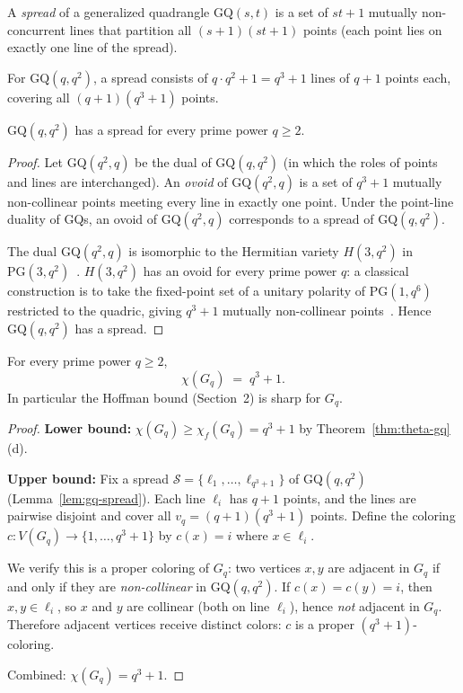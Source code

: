 \begin{definition}
A \emph{spread} of a generalized quadrangle $\mathrm{GQ}(s,t)$ is a set of $st+1$ mutually non-concurrent lines that partition all $(s+1)(st+1)$ points (each point lies on exactly one line of the spread).
\end{definition}

For $\mathrm{GQ}(q,q^2)$, a spread consists of $q\cdot q^2+1=q^3+1$ lines of $q+1$ points each, covering all $(q+1)(q^3+1)$ points.

\begin{lemma}\label{lem:gq-spread}
$\mathrm{GQ}(q,q^2)$ has a spread for every prime power $q\ge 2$.
\end{lemma}

\begin{proof}
Let $\mathrm{GQ}(q^2,q)$ be the dual of $\mathrm{GQ}(q,q^2)$ (in which the roles of points and lines are interchanged).  An \emph{ovoid} of $\mathrm{GQ}(q^2,q)$ is a set of $q^3+1$ mutually non-collinear points meeting every line in exactly one point.  Under the point-line duality of GQs, an ovoid of $\mathrm{GQ}(q^2,q)$ corresponds to a spread of $\mathrm{GQ}(q,q^2)$.

The dual $\mathrm{GQ}(q^2,q)$ is isomorphic to the Hermitian variety $H(3,q^2)$ in $\mathrm{PG}(3,q^2)$~\cite{PT1984}.  $H(3,q^2)$ has an ovoid for every prime power $q$: a classical construction is to take the fixed-point set of a unitary polarity of $\mathrm{PG}(1,q^6)$ restricted to the quadric, giving $q^3+1$ mutually non-collinear points~\cite{PT1984}.  Hence $\mathrm{GQ}(q,q^2)$ has a spread.
\end{proof}

\begin{theorem}\label{thm:chi-exact}
For every prime power $q\ge 2$,
\[
  \chi(G_q) \;=\; q^3+1.
\]
In particular the Hoffman bound (Section~2) is sharp for $G_q$.
\end{theorem}

\begin{proof}
\textbf{Lower bound:} $\chi(G_q)\ge\chi_f(G_q)=q^3+1$ by Theorem~\ref{thm:theta-gq}(d).

\textbf{Upper bound:} Fix a spread $\mathcal{S}=\{\ell_1,\ldots,\ell_{q^3+1}\}$ of $\mathrm{GQ}(q,q^2)$ (Lemma~\ref{lem:gq-spread}).  Each line $\ell_i$ has $q+1$ points, and the lines are pairwise disjoint and cover all $v_q=(q+1)(q^3+1)$ points.  Define the coloring $c:V(G_q)\to\{1,\ldots,q^3+1\}$ by $c(x)=i$ where $x\in\ell_i$.

We verify this is a proper coloring of $G_q$: two vertices $x,y$ are adjacent in $G_q$ if and only if they are \emph{non-collinear} in $\mathrm{GQ}(q,q^2)$.  If $c(x)=c(y)=i$, then $x,y\in\ell_i$, so $x$ and $y$ are collinear (both on line $\ell_i$), hence \emph{not} adjacent in $G_q$.  Therefore adjacent vertices receive distinct colors: $c$ is a proper $(q^3+1)$-coloring.

Combined: $\chi(G_q)=q^3+1$.
\end{proof}

